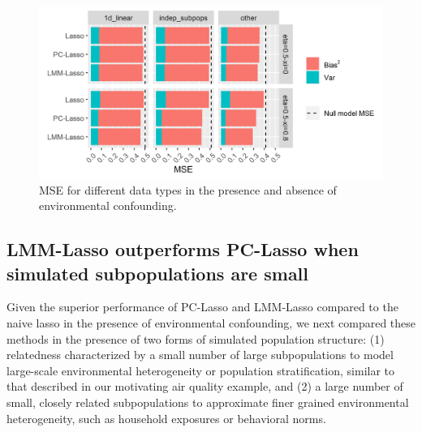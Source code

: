 

\begin{figure}[H]
    \centering
    \includegraphics[scale = 1.1]{figures/beta_mse.png}
    \caption{MSE for different data types in the presence and absence of environmental confounding. }
    \label{fig:mse}
\end{figure}


\subsection{LMM-Lasso outperforms PC-Lasso when simulated subpopulations are small}


Given the superior performance of PC-Lasso and LMM-Lasso compared to the naive lasso in the presence of environmental confounding, we next compared these methods in the presence of two forms of simulated population structure: (1) relatedness characterized by a small number of large subpopulations to model large-scale environmental heterogeneity or population stratification, similar to that described in our motivating air quality example, and (2) a large number of small, closely related subpopulations to approximate finer grained environmental heterogeneity, such as household exposures or behavioral norms. 

